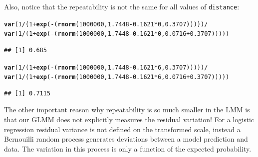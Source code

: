 \documentclass[12pt,a4paper]{scrartcl}\usepackage[]{graphicx}\usepackage[]{color}
\makeatletter
\newcommand{\hlnum}[1]{\textcolor[rgb]{0.686,0.059,0.569}{#1}}%
\newcommand{\hlopt}[1]{\textcolor[rgb]{0,0,0}{#1}}%
\newcommand{\hlstd}[1]{\textcolor[rgb]{0.345,0.345,0.345}{#1}}%
\newcommand{\hlkwd}[1]{\textcolor[rgb]{0.737,0.353,0.396}{\textbf{#1}}}%
\newenvironment{kframe}{%
 \def\at@end@of@kframe{}%
 \ifinner\ifhmode%
  \def\at@end@of@kframe{\end{minipage}}%
  \begin{minipage}{\columnwidth}%
 \fi\fi%
 \def\FrameCommand##1{\hskip\@totalleftmargin \hskip-\fboxsep
 \colorbox{shadecolor}{##1}\hskip-\fboxsep
     \hskip-\linewidth \hskip-\@totalleftmargin \hskip\columnwidth}%
 \MakeFramed {\advance\hsize-\width
   \@totalleftmargin\z@ \linewidth\hsize
   \@setminipage}}%
 {\par\unskip\endMakeFramed%
 \at@end@of@kframe}
\newenvironment{knitrout}{}{} %
\makeatother
\begin{document}
\begin{Answer}
Also, notice that the repeatability is not the same for all values of \texttt{distance}:
\begin{knitrout}
\color{fgcolor}\begin{kframe}
\begin{alltt}
\hlkwd{var}\hlstd{(}\hlnum{1}\hlopt{/}\hlstd{(}\hlnum{1}\hlopt{+}\hlkwd{exp}\hlstd{(}\hlopt{-}\hlstd{(}\hlkwd{rnorm}\hlstd{(}\hlnum{1000000}\hlstd{,} \hlnum{1.7448}\hlopt{-}\hlnum{0.1621}\hlopt{*}\hlnum{0}\hlstd{,} \hlnum{0.3707}\hlstd{)))))} \hlopt{/}
  \hlkwd{var}\hlstd{(}\hlnum{1}\hlopt{/}\hlstd{(}\hlnum{1}\hlopt{+}\hlkwd{exp}\hlstd{(}\hlopt{-}\hlstd{(}\hlkwd{rnorm}\hlstd{(}\hlnum{1000000}\hlstd{,} \hlnum{1.7448}\hlopt{-}\hlnum{0.1621}\hlopt{*}\hlnum{0}\hlstd{,} \hlnum{0.0716}\hlopt{+}\hlnum{0.3707}\hlstd{)))))}
\end{alltt}
\begin{verbatim}
## [1] 0.685
\end{verbatim}
\begin{alltt}
\hlkwd{var}\hlstd{(}\hlnum{1}\hlopt{/}\hlstd{(}\hlnum{1}\hlopt{+}\hlkwd{exp}\hlstd{(}\hlopt{-}\hlstd{(}\hlkwd{rnorm}\hlstd{(}\hlnum{1000000}\hlstd{,} \hlnum{1.7448}\hlopt{-}\hlnum{0.1621}\hlopt{*}\hlnum{6}\hlstd{,} \hlnum{0.3707}\hlstd{)))))} \hlopt{/}
  \hlkwd{var}\hlstd{(}\hlnum{1}\hlopt{/}\hlstd{(}\hlnum{1}\hlopt{+}\hlkwd{exp}\hlstd{(}\hlopt{-}\hlstd{(}\hlkwd{rnorm}\hlstd{(}\hlnum{1000000}\hlstd{,} \hlnum{1.7448}\hlopt{-}\hlnum{0.1621}\hlopt{*}\hlnum{6}\hlstd{,} \hlnum{0.0716}\hlopt{+}\hlnum{0.3707}\hlstd{)))))}
\end{alltt}
\begin{verbatim}
## [1] 0.7115
\end{verbatim}
\end{kframe}
\end{knitrout}

The other important reason why repeatability is so much smaller in the LMM is that our GLMM does not explicitly measures the residual variation! For a logistic regression residual variance is not defined on the transformed scale, instead a Bernouilli random process generates deviations between a model prediction and data. The variation in this process is only a function of the expected probability.


\end{Answer}
\end{document}
